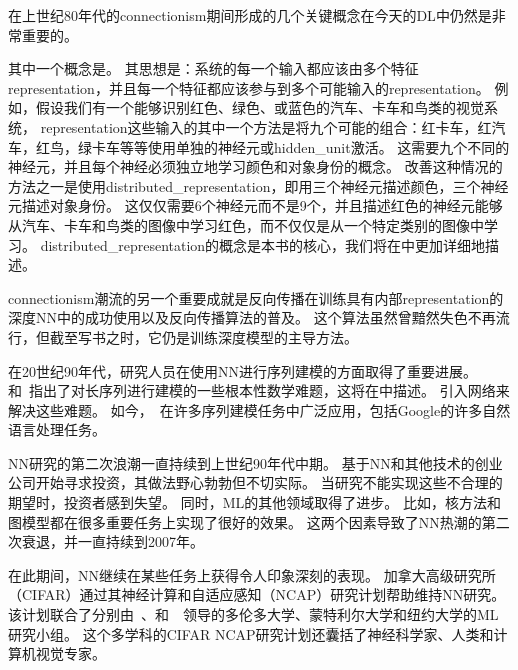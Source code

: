 在上世纪80年代的\gls{connectionism}期间形成的几个关键概念在今天的\gls{DL}中仍然是非常重要的。

其中一个概念是\citep{Hinton-et-al-PDP1986}。
其思想是：系统的每一个输入都应该由多个特征\gls{representation}，并且每一个特征都应该参与到多个可能输入的\gls{representation}。
例如，假设我们有一个能够识别红色、绿色、或蓝色的汽车、卡车和鸟类的视觉系统，
\gls{representation}这些输入的其中一个方法是将九个可能的组合：红卡车，红汽车，红鸟，绿卡车等等使用单独的神经元或\gls{hidden_unit}激活。
这需要九个不同的神经元，并且每个神经必须独立地学习颜色和对象身份的概念。
改善这种情况的方法之一是使用\gls{distributed_representation}，即用三个神经元描述颜色，三个神经元描述对象身份。 
这仅仅需要6个神经元而不是9个，并且描述红色的神经元能够从汽车、卡车和鸟类的图像中学习红色，而不仅仅是从一个特定类别的图像中学习。 
\gls{distributed_representation}的概念是本书的核心，我们将在中更加详细地描述。


\gls{connectionism}潮流的另一个重要成就是反向传播在训练具有内部\gls{representation}的深度\gls{NN}中的成功使用以及反向传播算法的普及\citep{Rumelhart86b-small,Lecun-these87}。
这个算法虽然曾黯然失色不再流行，但截至写书之时，它仍是训练深度模型的主导方法。%

在20世纪90年代，研究人员在使用\gls{NN}进行序列建模的方面取得了重要进展。
\citet{Hochreiter91}和~\citet{Bengio1994ITNN}指出了对长序列进行建模的一些根本性数学难题，这将在中描述。
\citet{Hochreiter+Schmidhuber-1997}引入网络来解决这些难题。
如今，~在许多序列建模任务中广泛应用，包括Google的许多自然语言处理任务。

\gls{NN}研究的第二次浪潮一直持续到上世纪90年代中期。
基于\gls{NN}和其他技术的创业公司开始寻求投资，其做法野心勃勃但不切实际。
当研究不能实现这些不合理的期望时，投资者感到失望。
同时，\gls{ML}的其他领域取得了进步。
比如，核方法\citep{Boser92,Cortes95,SchBurSmo99}和图模型\citep{Jordan98}都在很多重要任务上实现了很好的效果。
这两个因素导致了\gls{NN}热潮的第二次衰退，并一直持续到2007年。

在此期间，\gls{NN}继续在某些任务上获得令人印象深刻的表现\citep{LeCun98-small,Bengio-nnlm2001}。
加拿大高级研究所（CIFAR）通过其神经计算和自适应感知（NCAP）研究计划帮助维持\gls{NN}研究。
该计划联合了分别由~、和~~领导的多伦多大学、蒙特利尔大学和纽约大学的\gls{ML}研究小组。
这个多学科的CIFAR NCAP研究计划还囊括了神经科学家、人类和计算机视觉专家。


